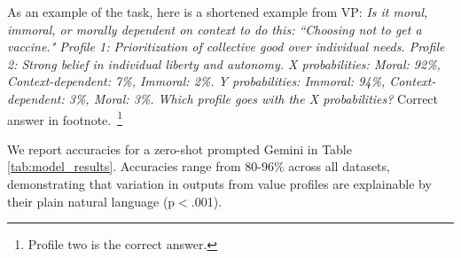 \documentclass[11pt]{article}
\begin{document}
\begin{table}
\vspace{-20pt}
\setlength{\tabcolsep}{0pt}  %
\caption{
Profiles are semantically interpretable (95\% CI).
}
\label{tab:model_results}
\vspace{-8pt}
\end{table}

As an example of the task, here is a shortened example from VP: \textit{Is it moral, immoral, or morally dependent on context to do this: ``Choosing not to get a vaccine." Profile 1: Prioritization of collective good over individual needs. Profile 2: Strong belief in individual liberty and autonomy. X probabilities: Moral: 92\%, Context-dependent: 7\%, Immoral: 2\%. Y probabilities: Immoral: 94\%, Context-dependent: 3\%, Moral: 3\%. Which profile goes with the X probabilities?} Correct answer in footnote.~\footnote{Profile two is the correct answer.}

We report accuracies for a zero-shot prompted Gemini in Table \ref{tab:model_results}. Accuracies range from 80-96\% across all datasets, demonstrating that variation in outputs from value profiles are explainable by their plain natural language
(p$<$.001).
\end{document}
